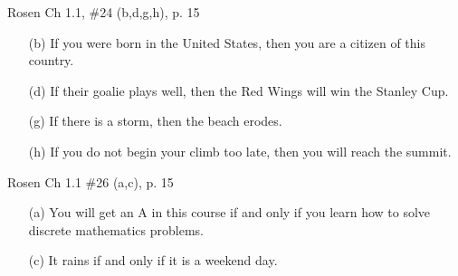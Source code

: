 \documentclass[12pt,addpoints]{exam}
\begin{document}
\begin{questions}
\question[8] Rosen Ch 1.1, \#24 (b,d,g,h), p. 15
    \ifprintanswers
        \vspace{-10pt}
    \fi
    \begin{solution}
        \begin{itemize}[itemsep=0pt,parsep=0pt,topsep=0pt,partopsep=0pt]
            \item[(b)] If you were born in the United States, then you are a citizen of this country.
            \item[(d)] If their goalie plays well, then the Red Wings will win the Stanley Cup.
            \item[(g)] If there is a storm, then the beach erodes.
            \item[(h)] If you do not begin your climb too late, then you will reach the summit.
        \end{itemize}
    \end{solution}

\question[4] Rosen Ch 1.1 \#26 (a,c), p. 15
    \ifprintanswers
        \vspace{-10pt}
    \fi
    \begin{solution}
        \begin{itemize}[itemsep=0pt,parsep=0pt,topsep=0pt,partopsep=0pt]
            \item[(a)] You will get an A in this course if and only if you learn how to solve discrete mathematics problems.
            \item[(c)] It rains if and only if it is a weekend day.
        \end{itemize}
    \end{solution}


\end{questions}
\end{document}
